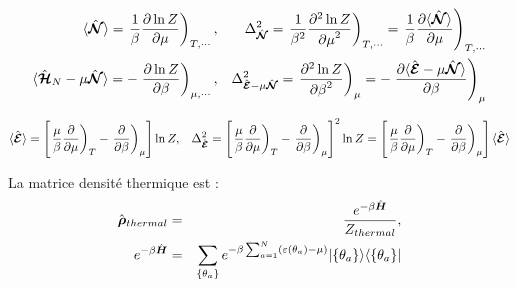 	
\begin{eqnarray}
	\langle \hat{\bm{\mathcal{N}}} \rangle  = \left .\frac{1}{\beta} \frac{ \partial \ln Z}{\partial \mu } \right )_{T,\cdots},  & & \Delta^2_{\hat{\bm{\mathcal{N}}}} = \left . \frac{1}{\beta^2} \frac{ \partial^2 \ln Z}{{\partial \mu}^2 } \right )_{T,\cdots} =  \left . \frac{1}{\beta} \frac{ \partial \langle \hat{\bm{\mathcal{N}}} \rangle}{\partial \mu } \right )_{T,\cdots}\\
	\langle \hat{\bm{\mathcal{H}}}_N - \mu\hat{\bm{\mathcal{N}}}  \rangle  = -\left . \frac{ \partial \ln Z}{\partial \beta } \right )_{\mu , \cdots} ,  & & \Delta^2_{\hat{\bm{\mathcal{E}}} - \mu\hat{\bm{\mathcal{N}}}} = \left .  \frac{ \partial^2 \ln Z}{{\partial \beta}^2 } \right )_\mu =  -\left .  \frac{ \partial \langle \hat{\bm{\mathcal{E}}} - \mu\hat{\bm{\mathcal{N}}} \rangle}{\partial \beta } \right )_\mu			
\end{eqnarray}

\begin{eqnarray}
	\langle \hat{\bm{\mathcal{E}}} \rangle  = \left [ \left .\frac{\mu}{\beta} \frac{ \partial}{\partial \mu } \right )_T -\left . \frac{ \partial }{\partial \beta } \right )_\mu  \right ]\ln Z,  & & \Delta^2_{\hat{\bm{\mathcal{E}}} } = \left [ \left .\frac{\mu}{\beta} \frac{ \partial}{\partial \mu } \right )_T -\left . \frac{ \partial }{\partial \beta } \right )_\mu  \right ]^2\ln Z=  \left [ \left .\frac{\mu}{\beta} \frac{ \partial}{\partial \mu } \right )_T -\left . \frac{ \partial }{\partial \beta } \right )_\mu  \right ]\langle \hat{\bm{\mathcal{E}}} \rangle		
\end{eqnarray}


	
	
	La matrice densité thermique est :
	\begin{eqnarray}
		\hat{\bm{\rho}}_{thermal} & = & \frac{e^{- \beta \hat{\bm{H}}}}{Z_{thermal}}, \\
		e^{-\beta \hat{\bm{H}}} & = & 	\sum_{\{\theta_a \}} e^{- \beta \sum_{a=1}^N ( \varepsilon(\theta_a)- \mu ) } \vert \{ \theta_a\} \rangle \langle  \{ \theta_a\}  \vert 
	\end{eqnarray}